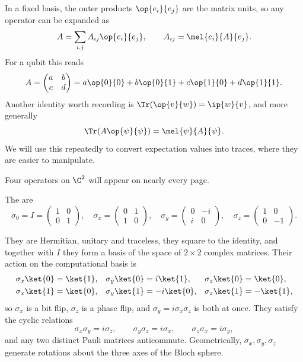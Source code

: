 In a fixed basis, the outer products $\op{e_i}{e_j}$ are the matrix units, so any operator can be expanded as
$$A = \sum_{i,j} A_{ij} \op{e_i}{e_j}, \qquad A_{ij} = \mel{e_i}{A}{e_j}.$$
For a qubit this reads
$$A = \begin{pmatrix} a & b \\ c & d\end{pmatrix} = a \op{0}{0} + b\op{0}{1} + c\op{1}{0} + d\op{1}{1}.$$
Another identity worth recording is $\Tr\!\left(\op{v}{w}\right) = \ip{w}{v}$, and more generally
$$\Tr\!\left(A \op{\psi}{\psi}\right) = \mel{\psi}{A}{\psi}.$$
We will use this repeatedly to convert expectation values into traces, where they are easier to manipulate.

Four operators on $\C^2$ will appear on nearly every page.

\begin{definition}
	The  are
	$$\sigma_0 = I = \begin{pmatrix} 1 & 0 \\ 0 & 1 \end{pmatrix},\quad \sigma_x = \begin{pmatrix} 0 & 1 \\ 1 & 0\end{pmatrix},\quad \sigma_y = \begin{pmatrix} 0 & -i \\ i & 0\end{pmatrix},\quad \sigma_z = \begin{pmatrix} 1 & 0 \\ 0 & -1\end{pmatrix}.$$
\end{definition}

They are Hermitian, unitary and traceless, they square to the identity, and together with $I$ they form a basis of the space of $2\times 2$ complex matrices. Their action on the computational basis is
\begin{align*}
	\sigma_x \ket{0} &= \ket{1}, & \sigma_y\ket{0} &= i\ket{1}, & \sigma_z\ket{0} &= \ket{0},\\
	\sigma_x\ket{1} &= \ket{0}, & \sigma_y\ket{1} &= -i\ket{0}, & \sigma_z\ket{1} &= -\ket{1},
\end{align*}
so $\sigma_x$ is a bit flip, $\sigma_z$ is a phase flip, and $\sigma_y = i\sigma_x\sigma_z$ is both at once. They satisfy the cyclic relations
$$\sigma_x\sigma_y = i\sigma_z, \qquad \sigma_y\sigma_z = i\sigma_x, \qquad \sigma_z\sigma_x = i\sigma_y,$$
and any two distinct Pauli matrices anticommute. Geometrically, $\sigma_x, \sigma_y, \sigma_z$ generate rotations about the three axes of the Bloch sphere.

